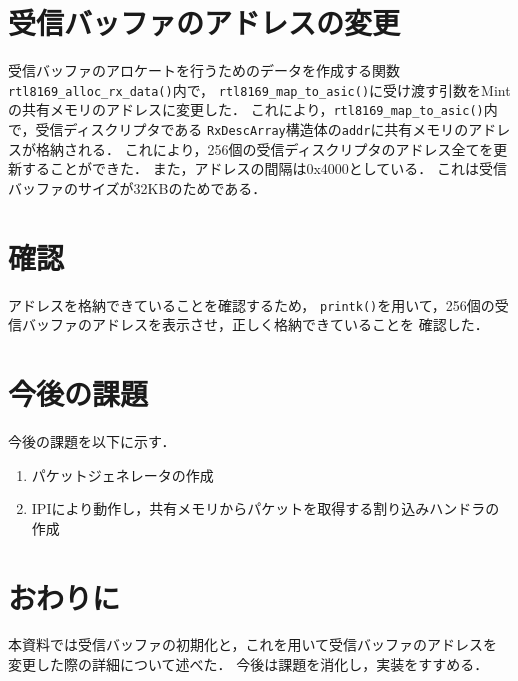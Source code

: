\documentclass[12pt]{jsarticle}
\begin{document}
\section{受信バッファのアドレスの変更}
受信バッファのアロケートを行うためのデータを作成する関数{\tt rtl8169\_alloc\_rx\_data()}内で，
{\tt rtl8169\_map\_to\_asic()}に受け渡す引数をMintの共有メモリのアドレスに変更した．
これにより，{\tt rtl8169\_map\_to\_asic()}内で，受信ディスクリプタである
{\tt RxDescArray}構造体の{\tt addr}に共有メモリのアドレスが格納される．
これにより，256個の受信ディスクリプタのアドレス全てを更新することができた．
また，アドレスの間隔は0x4000としている．
これは受信バッファのサイズが32KBのためである．
\section{確認}
アドレスを格納できていることを確認するため，
{\tt printk()}を用いて，256個の受信バッファのアドレスを表示させ，正しく格納できていることを
確認した．

\section{今後の課題}
今後の課題を以下に示す．

\begin{enumerate}
    \item パケットジェネレータの作成
    \item IPIにより動作し，共有メモリからパケットを取得する割り込みハンドラの作成
\end{enumerate}

\section{おわりに}
本資料では受信バッファの初期化と，これを用いて受信バッファのアドレスを
変更した際の詳細について述べた．
今後は課題を消化し，実装をすすめる．
\end{document}

